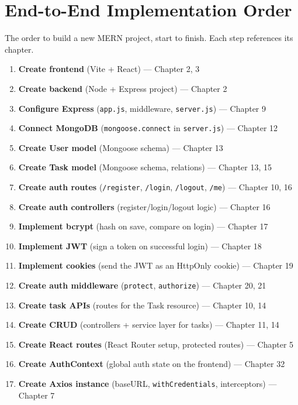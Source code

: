 \chapter{End-to-End Implementation Order}

\begin{notebox}[NOTE]
The order to build a new MERN project, start to finish. Each step references its chapter.
\end{notebox}

\begin{enumerate}
\item \textbf{Create frontend} (Vite + React) --- Chapter 2, 3
\item \textbf{Create backend} (Node + Express project) --- Chapter 2
\item \textbf{Configure Express} (\texttt{app.js}, middleware, \texttt{server.js}) --- Chapter 9
\item \textbf{Connect MongoDB} (\texttt{mongoose.connect} in \texttt{server.js}) --- Chapter 12
\item \textbf{Create User model} (Mongoose schema) --- Chapter 13
\item \textbf{Create Task model} (Mongoose schema, relations) --- Chapter 13, 15
\item \textbf{Create auth routes} (\texttt{/register}, \texttt{/login}, \texttt{/logout}, \texttt{/me}) --- Chapter 10, 16
\item \textbf{Create auth controllers} (register/login/logout logic) --- Chapter 16
\item \textbf{Implement bcrypt} (hash on save, compare on login) --- Chapter 17
\item \textbf{Implement JWT} (sign a token on successful login) --- Chapter 18
\item \textbf{Implement cookies} (send the JWT as an HttpOnly cookie) --- Chapter 19
\item \textbf{Create auth middleware} (\texttt{protect}, \texttt{authorize}) --- Chapter 20, 21
\item \textbf{Create task APIs} (routes for the Task resource) --- Chapter 10, 14
\item \textbf{Create CRUD} (controllers + service layer for tasks) --- Chapter 11, 14
\item \textbf{Create React routes} (React Router setup, protected routes) --- Chapter 5
\item \textbf{Create AuthContext} (global auth state on the frontend) --- Chapter 32
\item \textbf{Create Axios instance} (baseURL, \texttt{withCredentials}, interceptors) --- Chapter 7

\end{enumerate}
